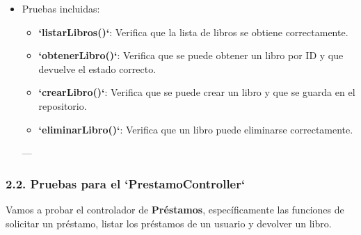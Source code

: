 \documentclass[11pt]{article}
\begin{document}
\begin{itemize}
\item Pruebas incluidas:
\label{sec:orgcfb1378}
\begin{itemize}
\item \textbf{\textbf{`listarLibros()`}}: Verifica que la lista de libros se obtiene correctamente.
\item \textbf{\textbf{`obtenerLibro()`}}: Verifica que se puede obtener un libro por ID y que devuelve el estado correcto.
\item \textbf{\textbf{`crearLibro()`}}: Verifica que se puede crear un libro y que se guarda en el repositorio.
\item \textbf{\textbf{`eliminarLibro()`}}: Verifica que un libro puede eliminarse correctamente.
\end{itemize}

---
\end{itemize}

\subsubsection{2.2. Pruebas para el `PrestamoController`}
\label{sec:org46fd572}

Vamos a probar el controlador de \textbf{\textbf{Préstamos}}, específicamente las funciones de solicitar un préstamo, listar los préstamos de un usuario y devolver un libro.
\end{document}
